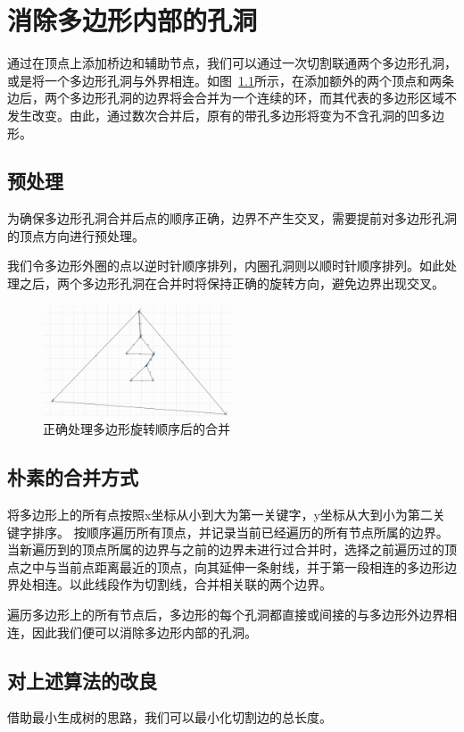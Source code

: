 
\chapter{消除多边形内部的孔洞}
通过在顶点上添加桥边和辅助节点，我们可以通过一次切割联通两个多边形孔洞，或是将一个多边形孔洞与外界相连。如图~\ref*{merge}所示，在添加额外的两个顶点和两条边后，两个多边形孔洞的边界将会合并为一个连续的环，而其代表的多边形区域不发生改变。由此，通过数次合并后，原有的带孔多边形将变为不含孔洞的凹多边形。
\section{预处理}
为确保多边形孔洞合并后点的顺序正确，边界不产生交叉，需要提前对多边形孔洞的顶点方向进行预处理。

我们令多边形外圈的点以逆时针顺序排列，内圈孔洞则以顺时针顺序排列。如此处理之后，两个多边形孔洞在合并时将保持正确的旋转方向，避免边界出现交叉。

\begin{figure}[htp]
    \centering
    \includegraphics[width=0.5\textwidth]
    {figures/mergehole.png}
    \caption{正确处理多边形旋转顺序后的合并}
    \label{merge}
  \end{figure}

\section{朴素的合并方式}
将多边形上的所有点按照x坐标从小到大为第一关键字，y坐标从大到小为第二关键字排序。
按顺序遍历所有顶点，并记录当前已经遍历的所有节点所属的边界。
当新遍历到的顶点所属的边界与之前的边界未进行过合并时，选择之前遍历过的顶点之中与当前点距离最近的顶点，向其延伸一条射线，并于第一段相连的多边形边界处相连。以此线段作为切割线，合并相关联的两个边界。

遍历多边形上的所有节点后，多边形的每个孔洞都直接或间接的与多边形外边界相连，因此我们便可以消除多边形内部的孔洞。
\section{对上述算法的改良}
借助最小生成树的思路，我们可以最小化切割边的总长度。


